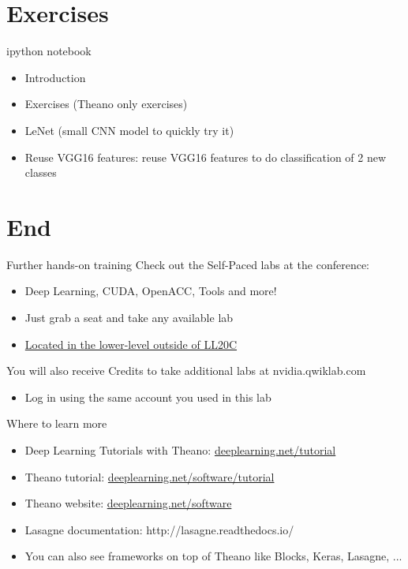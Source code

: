 \documentclass[utf8x,xcolor=pdftex,dvipsnames,table]{beamer}
\begin{document}
\section{Exercises}
\begin{frame}
  \tableofcontents[currentsection]
\end{frame}

\begin{frame}{ipython notebook}
\begin{itemize}
\item Introduction
\item Exercises (Theano only exercises)
\item LeNet (small CNN model to quickly try it)
\item Reuse VGG16 features: reuse VGG16 features to do classification of 2 new classes
\end{itemize}
\end{frame}


\section{End}
\begin{frame}{Further hands-on training}
Check out the Self-Paced labs at the conference:
\begin{itemize}
  \item Deep Learning, CUDA, OpenACC, Tools and more!
  \item Just grab a seat and take any available lab
  \item \underline{Located in the lower-level outside of LL20C}\newline
\end{itemize}

You will also receive Credits to take additional labs at nvidia.qwiklab.com
\begin{itemize}
\item Log in using the same account you used in this lab
\end{itemize}
\end{frame}

\begin{frame}{Where to learn more}
\normalsize
\begin{itemize}
\item Deep Learning Tutorials with Theano: \url{deeplearning.net/tutorial}
\item Theano tutorial: \url{deeplearning.net/software/tutorial}
\item Theano website: \url{deeplearning.net/software}
\item Lasagne documentation: http://lasagne.readthedocs.io/
\item You can also see frameworks on top of Theano like Blocks, Keras, Lasagne, ...
\end{itemize}

\end{frame}
\end{document}
